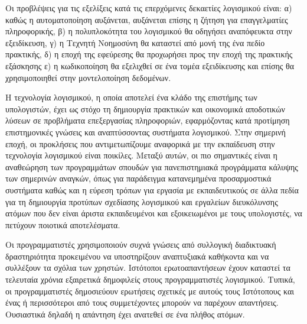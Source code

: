 \documentclass[11pt,a4paper,twoside,english,greek]{article}
\begin{document}
{\setlength{\parindent}{1cm} Οι προβλέψεις για τις εξελίξεις κατά τις επερχόμενες δεκαετίες λογισμικού  είναι: α) καθώς η αυτοματοποίηση αυξάνεται, αυξάνεται επίσης η ζήτηση για επαγγελματίες πληροφορικής, β) η πολυπλοκότητα του λογισμικού θα οδηγήσει αναπόφευκτα στην εξειδίκευση, γ)  η Τεχνητή Νοημοσύνη θα καταστεί από μονή της ένα πεδίο πρακτικής,  δ) η εποχή της εφεύρεσης θα προχωρήσει προς την εποχή της πρακτικής εξάσκησης ε) η κωδικοποίηση θα εξελιχθεί σε ένα τομέα εξειδίκευσης και επίσης θα χρησιμοποιηθεί στην μοντελοποίηση δεδομένων.

\setlength{\parindent}{1cm} Η τεχνολογία λογισμικού, η οποία αποτελεί ένα κλάδο της επιστήμης των υπολογιστών, έχει ως στόχο τη δημιουργία πρακτικών και οικονομικά αποδοτικών λύσεων σε προβλήματα επεξεργασίας πληροφοριών, εφαρμόζοντας κατά προτίμηση επιστημονικές γνώσεις και αναπτύσσοντας συστήματα λογισμικού. Στην σημερινή εποχή, οι προκλήσεις που  αντιμετωπίζουμε αναφορικά με την εκπαίδευση στην τεχνολογία λογισμικού είναι ποικίλες. Μεταξύ αυτών, οι πιο σημαντικές είναι η αναθεώρηση των προγραμμάτων σπουδών για πανεπιστημιακά προγράμματα κάλυψης των σημερινών αναγκών, όπως για παράδειγμα κατανεμημένα προσαρμοστικά συστήματα καθώς και η εύρεση τρόπων για εργασία με εκπαιδευτικούς σε άλλα πεδία για τη δημιουργία προτύπων σχεδίασης λογισμικού και εργαλείων διευκόλυνσης ατόμων που δεν είναι άριστα εκπαιδευμένοι και εξοικειωμένοι με τους υπολογιστές, να πετύχουν ποιοτικά αποτελέσματα.

\setlength{\parindent}{1cm} Οι προγραμματιστές χρησιμοποιούν συχνά γνώσεις από συλλογική διαδικτυακή δραστηριότητα προκειμένου να υποστηρίξουν αναπτυξιακά καθήκοντα και να συλλέξουν τα σχόλια των χρηστών. Ιστότοποι ερωτοαπαντήσεων έχουν καταστεί τα τελευταία χρόνια εξαιρετικά δημοφιλείς στους προγραμματιστές λογισμικού. Τυπικά, οι προγραμματιστές δημοσιεύουν ερωτήσεις σχετικές με αυτούς τους Ιστότοπους και ένας ή περισσότεροι από τους συμμετέχοντες μπορούν να παρέχουν απαντήσεις. Ουσιαστικά δηλαδή η απάντηση έχει ανατεθεί σε ένα πλήθος ατόμων. 

}
\end{document}
